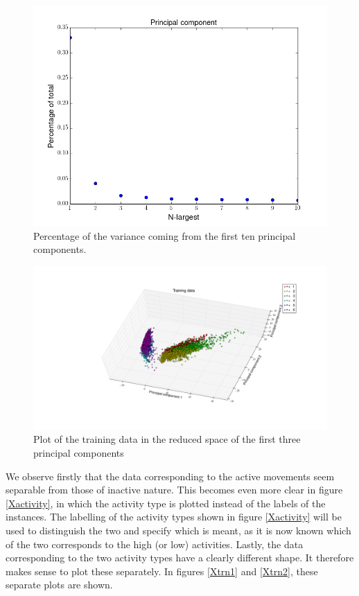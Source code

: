\documentclass [a4paper] {report}
\begin{document}
	\begin{figure}[H]
		\begin{center}
			\includegraphics[scale=0.35]{Images/singvals.png}
		\end{center}
		\caption{Percentage of the variance coming from the first ten principal components.}
		\label{singvals}
	\end{figure}
	
	\begin{figure}[H]
		\begin{center}
			\includegraphics[scale=0.35]{Images/Xtrn.png}
		\end{center}
		\caption{Plot of the training data in the reduced space of the first three principal components}
		\label{Xtrn}
	\end{figure}
	
	\noindent
	We observe firstly that the data corresponding to the active movements seem separable from those of inactive nature. This becomes even more clear in figure \ref{Xactivity}, in which the activity type is plotted instead of the labels of the instances. The labelling of the activity types shown in figure \ref{Xactivity} will be used to distinguish the two and specify which is meant, as it is now known which of the two corresponds to the high (or low) activities. Lastly, the data corresponding to the two activity types have a clearly different shape. It therefore makes sense to plot these separately. In figures \ref{Xtrn1} and \ref{Xtrn2}, these separate plots are shown.
	
\end{document}
